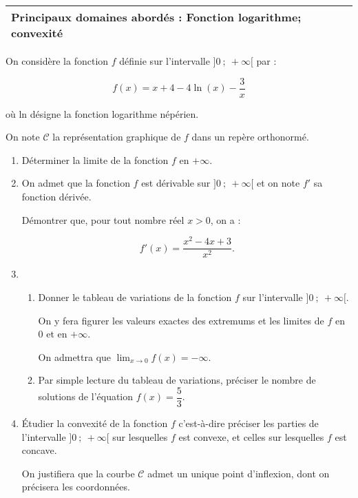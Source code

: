 
\medskip

\begin{tabularx}{\linewidth}{|X|}\hline
\textbf{Principaux domaines abordés : Fonction logarithme; convexité}
\\ \hline
\end{tabularx}

\medskip

On considère la fonction $f$ définie sur l'intervalle $]0~;~ +\infty[$ par :

\[f(x) = x + 4 - 4 \ln (x) - \dfrac{3}{x}\]

où ln désigne la fonction logarithme népérien.

On note $\mathcal{C}$ la représentation graphique de $f$ dans un repère orthonormé.

\medskip

\begin{enumerate}
\item Déterminer la limite de la fonction $f$ en $+\infty$.
\item On admet que la fonction $f$ est dérivable sur $]0~;~ +\infty[$ et on note $f'$ sa fonction dérivée.

Démontrer que, pour tout nombre réel $x > 0$, on a :

\[f'(x) = \dfrac{x^2 - 4x + 3}{x^2}.\]

\item
	\begin{enumerate}
		\item Donner le tableau de variations de la fonction $f$ sur l'intervalle $]0~;~ +\infty[$. 
		
On y fera figurer les valeurs exactes des extremums et les limites de $f$ en $0$ et en $+ \infty$. 
		
On admettra que $\displaystyle\lim_{x \to 0} f(x) = - \infty$.
		\item Par simple lecture du tableau de variations, préciser le nombre de solutions de l'équation $f(x) = \dfrac{5}{3}$.
	\end{enumerate}
\item Étudier la convexité de la fonction $f$ c'est-à-dire préciser les parties de l'intervalle $]0~;~ +\infty[$ sur lesquelles $f$ est convexe, et celles sur lesquelles $f$ est concave. 

On justifiera que la courbe $\mathcal C$ admet un unique point d'inflexion, dont on précisera les coordonnées.
\end{enumerate}
